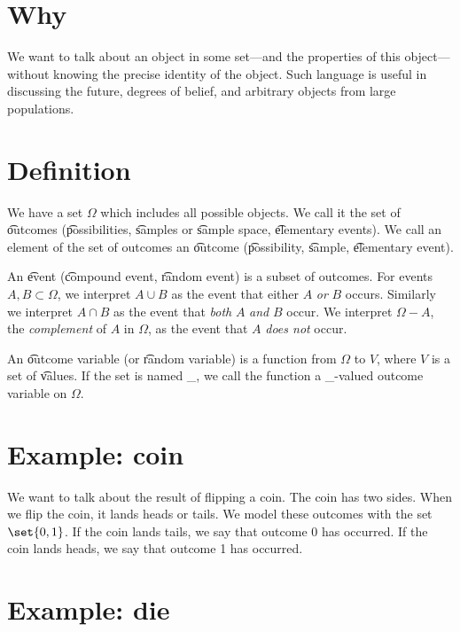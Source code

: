 

\section*{Why}

We want to talk about an object in some set---and the properties of this object---without knowing the precise identity of the object.
Such language is useful in discussing the future, degrees of belief, and arbitrary objects from large populations.

\section*{Definition}

We have a set $\Omega $ which includes all possible objects.
We call it the set of \t{outcomes} (\t{possibilities}, \t{samples} or \t{sample space}, \t{elementary events}).
We call an element of the set of outcomes an \t{outcome} (\t{possibility}, \t{sample}, \t{elementary event}).

An \t{event} (\t{compound event}, \t{random event}) is a subset of outcomes.
For events $A, B \subset \Omega $, we interpret $A \cup B$ as the event that either $A$ \textit{or} $B$ occurs.
Similarly we interpret $A \cap  B$ as the event that \textit{both} $A$ \textit{and} $B$ occur.
We interpret $\Omega  - A$, the \textit{complement} of $A$ in $\Omega $, as the event that $A$ \textit{does not} occur.

An \t{outcome variable} (or \t{random variable}) is a function from $\Omega $ to $V$, where $V$ is a set of \t{values}.
If the set is named \_, we call the function a \_-valued outcome variable on $\Omega $.

\section*{Example: coin}

We want to talk about the result of flipping a coin.
The coin has two sides.
When we flip the coin, it lands heads or tails.
We model these outcomes with the set $\set{0, 1}$.
If the coin lands tails, we say that outcome 0 has occurred.
If the coin lands heads, we say that outcome 1 has occurred.

\section*{Example: die}

